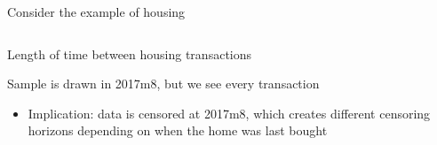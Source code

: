 \documentclass[notes,11pt, aspectratio=169]{beamer}
\newenvironment{wideitemize}{\itemize\addtolength{\itemsep}{10pt}}{\enditemize}
\begin{document}
\begin{frame}{Consider the example of housing}
  \begin{columns}[T] %
    \begin{column}{.4\textwidth}
      \begin{wideitemize}
      \item Length of time between housing transactions
      \item Sample is drawn in 2017m8, but we see every transaction
        \begin{itemize}
        \item Implication: data is censored at 2017m8, which creates different censoring horizons depending on when the home was last bought
        \end{itemize}
      \end{wideitemize}
    \end{column}%
  \hfill%
  \begin{column}{.6\textwidth}

\end{column}
\end{columns}
\end{frame}
\end{document}
